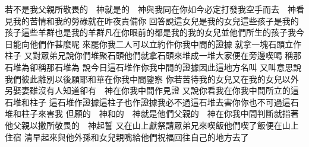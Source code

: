 若不是我父親所敬畏的　神\chientien 就是的　神與我同在\chientien 你如今必定打發我空手而去\yuentien 　神看見我的苦情\chientien 和我的勞碌\chientien 就在昨夜責備你\chuan\Chuan
{}回答說\chientien 這女兒是我的女兒\chientien 這些孩子是我的孩子\chientien 這些羊群也是我的羊群\chientien 凡在你眼前的都是我的\yuentien 我的女兒\chientien 並他們所生的孩子\chientien 我今日能向他們作甚麼呢\chuan 
{}來罷\chientien 你我二人可以立約\chientien 作你我中間的證據\chuan 
{}就拿一塊石頭立作柱子\chuan 
{}又對眾弟兄說\chientien 你們堆聚石頭\yuentien 他們就拿石頭來堆成一堆\chientien 大家便在旁邊喫喝\chuan 
{}稱那石堆為\chientien{}卻稱那石堆為\chuan{}
說\chientien 今日這石堆作你我中間的證據\yuentien 因此這地方名叫\chientien 
{}又叫\chientien 意思說\chientien 我們彼此離別以後\chientien 願耶和華在你我中間鑒察\chuan 
{}你若苦待我的女兒\chientien 又在我的女兒以外另娶妻\chientien 雖沒有人知道\chientien 卻有　神在你我中間作見證\chuan 
{}又說\chientien 你看我在你我中間所立的這石堆\chientien 和柱子\yuentien 
{}這石堆作證據\chientien 這柱子也作證據\chientien 我必不過這石堆去害你\chientien 你也不可過這石堆和柱子\chientien 來害我\yuentien 
{}但願的　神\chientien 和的　神\chientien 就是他們父親的　神\chientien 在你我中間判斷\yuentien{}就指著他父親以撒所敬畏的　神起誓\chuan 
{}又在山上獻祭\chientien 請眾弟兄來喫飯\yuentien 他們喫了飯\chientien 便在山上住宿\chuan 
{}清早起來\chientien 與他外孫和女兒親嘴\chientien 給他們祝福\chientien 回往自己的地方去了\chuan 
